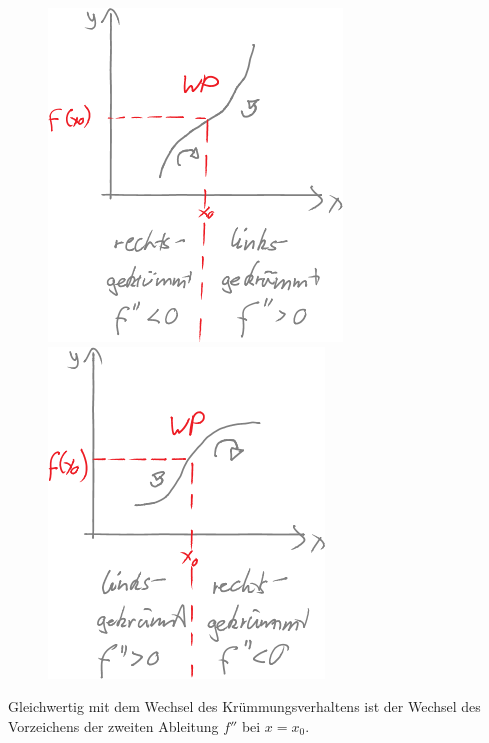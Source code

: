 \begin{figure}[h!]
	\begin{minipage}{0.49\linewidth}
		\centering \includegraphics[width=0.7\linewidth]{Bilder/157}
	\end{minipage}
	\begin{minipage}{0.49\linewidth}
		\centering \includegraphics[width=0.7\linewidth]{Bilder/158}
	\end{minipage}
	\caption{}
\end{figure}

Gleichwertig mit dem Wechsel des Krümmungsverhaltens ist der Wechsel des Vorzeichens der zweiten Ableitung $f''$ bei $x=x_0$.

